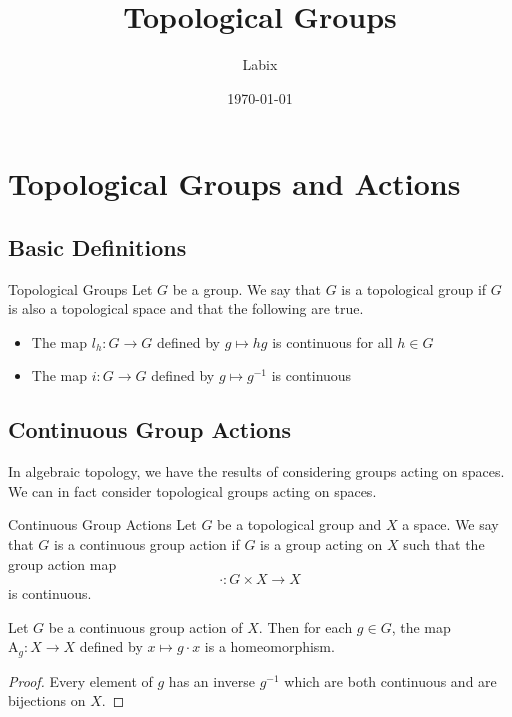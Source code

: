 \documentclass[a4paper]{article}
\title{Topological Groups}
\author{Labix}
\date{\today}
\begin{document}
\maketitle
\begin{abstract}
\end{abstract}
\pagebreak
\tableofcontents
\pagebreak

\section{Topological Groups and Actions}
\subsection{Basic Definitions}
\begin{defn}{Topological Groups}{} Let $G$ be a group. We say that $G$ is a topological group if $G$ is also a topological space and that the following are true. 
\begin{itemize}
\item The map $l_h:G\to G$ defined by $g\mapsto hg$ is continuous for all $h\in G$
\item The map $i:G\to G$ defined by $g\mapsto g^{-1}$ is continuous
\end{itemize}
\end{defn}

\subsection{Continuous Group Actions}
In algebraic topology, we have the results of considering groups acting on spaces. We can in fact consider topological groups acting on spaces. 

\begin{defn}{Continuous Group Actions}{} Let $G$ be a topological group and $X$ a space. We say that $G$ is a continuous group action if $G$ is a group acting on $X$ such that the group action map $$\cdot:G\times X\to X$$ is continuous. 
\end{defn}

\begin{prp}{}{} Let $G$ be a continuous group action of $X$. Then for each $g\in G$, the map $\text{A}_g:X\to X$ defined by $x\mapsto g\cdot x$ is a homeomorphism. \tcbline
\begin{proof}
Every element of $g$ has an inverse $g^{-1}$ which are both continuous and are bijections on $X$. 
\end{proof}
\end{prp}
\end{document}
